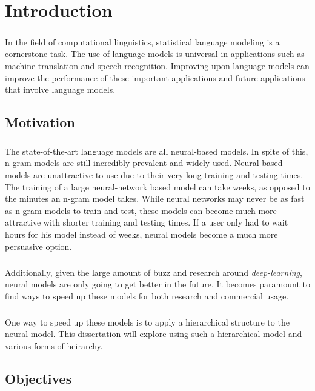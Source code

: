 
\chapter{Introduction}
\paragraph{}
In the field of computational linguistics, statistical language modeling is a cornerstone task. The use of language models  is universal in applications such as machine translation and speech recognition.  Improving upon language models can improve the performance of these important applications and future applications that involve language models.
\section{Motivation}
\paragraph{}
The state-of-the-art language models are all neural-based models. In spite of this, n-gram models are still incredibly prevalent and widely used. Neural-based models are unattractive to use due to their very long training and testing times. The training of a large neural-network based model can take weeks, as opposed to the minutes an n-gram model takes. While neural networks may never be as fast as n-gram models to train and test, these models can become much more attractive with shorter training and testing times. If a user only had to wait hours for his model instead of weeks, neural models become a much more persuasive option.
\paragraph{}
Additionally, given the large amount of buzz and research around \emph{deep-learning}, neural models are only going to get better in the future. It becomes paramount to find ways to speed up these models for both research and commercial usage.
\paragraph{}
One way to speed up these models is to apply a hierarchical structure to the neural model. This dissertation will explore using such a hierarchical model and various forms of heirarchy.

\section{Objectives}
